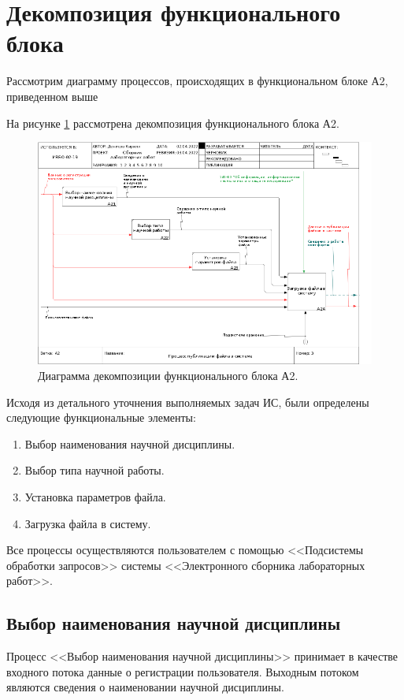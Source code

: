 \documentclass[a4paper,14pt]{extarticle}
\begin{document}
\section{Декомпозиция функционального блока}
Рассмотрим диаграмму процессов, происходящих в функциональном
блоке А2, приведенном выше

На рисунке \ref{fig:03a2} рассмотрена декомпозиция функционального блока А2.

\begin{figure}[h!]
	\centering
	\includegraphics[width=0.8\linewidth]{images/ramus/03_A2}
	\caption{Диаграмма декомпозиции функционального блока А2.}
	\label{fig:03a2}
\end{figure}

Исходя из детального уточнения выполняемых задач ИС, были определены
следующие функциональные элементы:

\begin{enumerate}
	\item Выбор наименования научной дисциплины.
	\item Выбор типа научной работы.
	\item Установка параметров файла.
	\item Загрузка файла в систему.
\end{enumerate}

Все процессы осуществляются пользователем с помощью <<Подсистемы обработки запросов>> системы <<Электронного сборника лабораторных работ>>.

\subsection{Выбор наименования научной дисциплины}
Процесс <<Выбор наименования научной дисциплины>> принимает в качестве входного потока данные о регистрации пользователя. Выходным потоком являются сведения о наименовании научной дисциплины. 
\end{document}
